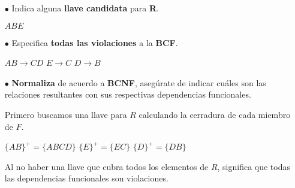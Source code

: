 \documentclass[12pt, letterpaper]{article}
\begin{document}
\begin{itemize}
\begin{itemize}
\begin{itemize}
                        \item[$\bullet$]    Indica alguna \textbf{llave candidata} 
                                            para \textbf{R}. 

                                            \begin{center}
                                                $ABE$
                                            \end{center}

                        \item[$\bullet$]    Especifica \textbf{todas las violaciones} 
                                            a la \textbf{BCF}.

                                            \begin{center}
                                                $AB \rightarrow CD$ \hspace{.5cm} $E \rightarrow C$ 
                                                \hspace{.5cm} $D \rightarrow B$
                                            \end{center}

                        \item[$\bullet$]    \textbf{Normaliza} de acuerdo a 
                                            \textbf{BCNF}, asegúrate de indicar 
                                            cuáles son las relaciones
                                            resultantes con sus respectivas 
                                            dependencias funcionales. \vspace{.3cm}

                                            Primero buscamos una llave para $R$ calculando la cerradura 
                                            de cada miembro de $F$. \vspace{.1cm}

                                            $\{AB\}^+=\{ABCD\}$ \hspace{.5cm} $\{E\}^+=\{EC\}$ 
                                            \hspace{.5cm} $\{D\}^+=\{DB\}$\vspace{.3cm}

                                            Al no haber una llave que cubra todos los elementos de $R$, significa que 
                                            todas las dependencias funcionales son violaciones.\vspace{.3cm}
                                            

\end{itemize}
\end{itemize}
\end{itemize}
\end{document}
